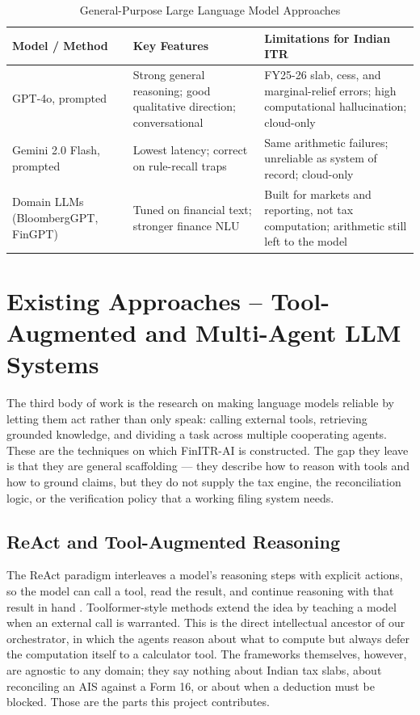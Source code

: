 \begin{table}[H]
\centering
\caption{General-Purpose Large Language Model Approaches}
\label{tab:cat-b-comparison}
\small
\begin{tabularx}{\textwidth}{|l|X|X|}
\hline
\textbf{Model / Method} & \textbf{Key Features} & \textbf{Limitations for Indian ITR} \\
\hline
GPT-4o, prompted \cite{ref4} & Strong general reasoning; good qualitative direction; conversational & FY25-26 slab, cess, and marginal-relief errors; high computational hallucination; cloud-only \\
\hline
Gemini 2.0 Flash, prompted \cite{ref5} & Lowest latency; correct on rule-recall traps & Same arithmetic failures; unreliable as system of record; cloud-only \\
\hline
Domain LLMs (BloombergGPT, FinGPT) \cite{ref6} & Tuned on financial text; stronger finance NLU & Built for markets and reporting, not tax computation; arithmetic still left to the model \\
\hline
\end{tabularx}
\end{table}

\section{Existing Approaches -- Tool-Augmented and Multi-Agent LLM Systems}
\label{sec:category-c}

The third body of work is the research on making language models reliable by
letting them act rather than only speak: calling external tools, retrieving
grounded knowledge, and dividing a task across multiple cooperating agents.
These are the techniques on which FinITR-AI is constructed. The gap they leave
is that they are general scaffolding --- they describe how to reason with tools
and how to ground claims, but they do not supply the tax engine, the
reconciliation logic, or the verification policy that a working filing system
needs.

\subsection{ReAct and Tool-Augmented Reasoning}
The ReAct paradigm interleaves a model's reasoning steps with explicit actions,
so the model can call a tool, read the result, and continue reasoning with that
result in hand \cite{ref7}. Toolformer-style methods extend the idea by teaching
a model when an external call is warranted. This is the direct intellectual
ancestor of our orchestrator, in which the agents reason about what to compute
but always defer the computation itself to a calculator tool. The frameworks
themselves, however, are agnostic to any domain; they say nothing about Indian
tax slabs, about reconciling an AIS against a Form 16, or about when a deduction
must be blocked. Those are the parts this project contributes.

